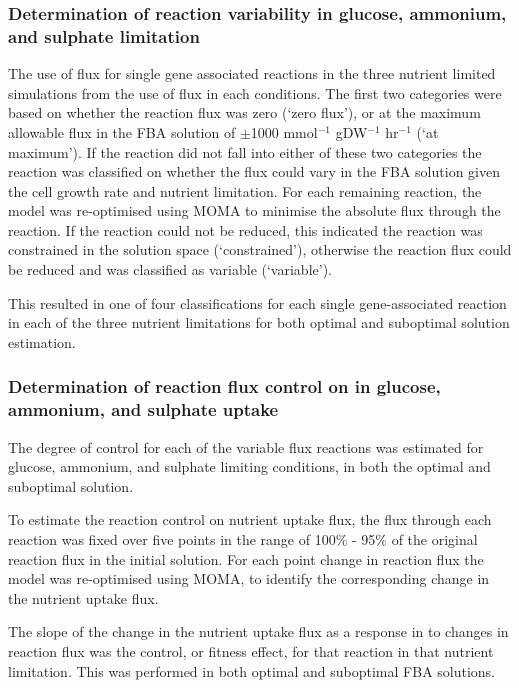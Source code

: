 \subsubsection{Determination of reaction variability in glucose, ammonium, and sulphate limitation}%

The use of flux for single gene associated reactions in the three nutrient limited simulations from the use of flux in each conditions. The first two categories were based on whether the reaction flux was zero (`zero flux'), or at the maximum allowable flux in the FBA solution of $\pm$1000 mmol$^{-1}$ gDW$^{-1}$ hr$^{-1}$ (`at maximum'). If the reaction did not fall into either of these two categories the reaction was classified on whether the flux could vary in the FBA solution given the cell growth rate and nutrient limitation. For each remaining reaction, the model was re-optimised using MOMA to minimise the absolute flux through the reaction. If the reaction could not be reduced, this indicated the reaction was constrained in the solution space (`constrained'), otherwise the reaction flux could be reduced and was classified as variable (`variable').

This resulted in one of four classifications for each single gene-associated reaction in each of the three nutrient limitations for both optimal and suboptimal solution estimation.

\subsubsection{Determination of reaction flux control on in glucose, ammonium, and sulphate uptake}%

The degree of control for each of the variable flux reactions was estimated for glucose, ammonium, and sulphate limiting conditions, in both the optimal and suboptimal solution.

To estimate the reaction control on nutrient uptake flux, the flux through each reaction was fixed over five points in the range of 100\% - 95\% of the original reaction flux in the initial solution. For each point change in reaction flux the model was re-optimised using MOMA, to identify the corresponding change in the nutrient uptake flux.

The slope of the change in the nutrient uptake flux as a response in to changes in reaction flux was the control, or fitness effect, for that reaction in that nutrient limitation. This was performed in both optimal and suboptimal FBA solutions.

